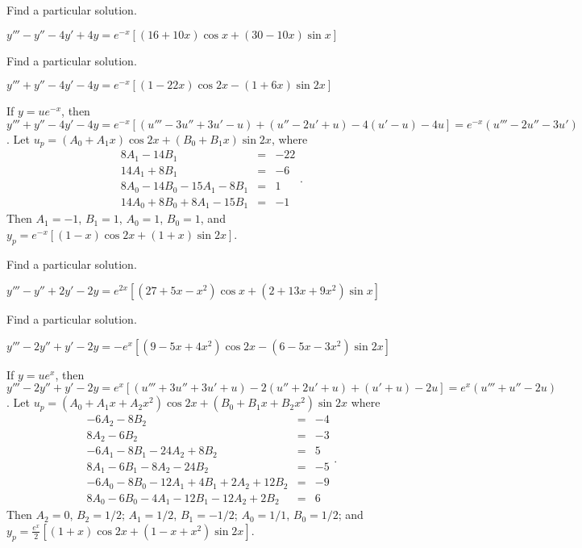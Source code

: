 \documentclass{ximera}
\begin{document}
\begin{problem}\label{exer:9.3.29}   Find a particular solution.

$y'''-y''-4y'+4y=e^{-x}\left[(16+10x)\cos
x+(30-10x)\sin x\right]$
\end{problem}

\begin{problem}\label{exer:9.3.30}   Find a particular solution.

$y'''+y''-4y'-4y=e^{-x}\left[(1-22x)\cos
2x-(1+6x)\sin2x\right]$

\begin{solution}
If $y=ue^{-x}$, then
$y'''+y''-4y'-4y=e^{-x}[
(u'''-3u''+3u'-u) +(u''-2u'+u) -4(u'-u) -4u]
=e^{-x}(u'''-2u''-3u')$.
Let $u_p=(A_0+A_1x)\cos2x+(B_0+B_1x)\sin2x$, where
$$
\begin{array}{rcr}
8A_1-14B_1&=&-22\\
14A_1+8B_1&=&-6\\
8A_0-14B_0-15A_1-8B_1&=&1\\
14A_0+8B_0+8A_1-15B_1&=&-1
\end{array}.
$$
Then
$A_1=-1$, $B_1=1$, $A_0=1$, $B_0=1$, and
$y_p=e^{-x}\left[(1-x)\cos2x+(1+x)\sin2x\right]$.
\end{solution}
\end{problem}

\begin{problem}\label{exer:9.3.31}   Find a particular solution.

$y'''-y''+2y'-2y=e^{2x}[(27+5x-x^2)\cos
x+(2+13x+9x^2)\sin x]$
\end{problem}

\begin{problem}\label{exer:9.3.32}   Find a particular solution.

$y'''-2y''+y'-2y=-e^x[(9-5x+4x^2)\cos
2x-(6-5x-3x^2)\sin2x]$

\begin{solution}
If $y=ue^x$, then
$y'''-2y''+y'-2y=e^x[
(u'''+3u''+3u'+u) -2(u''+2u'+u) +(u'+u) -2u]
=e^x(u'''+u''-2u)$.
Let $u_p=(A_0+A_1x+A_2x^2)\cos2x+(B_0+B_1x+B_2x^2)\sin2x$ where
$$
\begin{array}{rcr}
-6A_2-8B_2&=&-4\\
8A_2-6B_2&=&-3\\
-6A_1-8B_1-24A_2+8B_2&=&5\\
8A_1-6B_1-8A_2-24B_2&=&-5\\
-6A_0-8B_0-12A_1+4B_1+2A_2+12B_2&=&-9\\
8A_0-6B_0-4A_1-12B_1-12A_2+2B_2&=&6
\end{array}.
$$
Then $A_2=0$, $B_2=1/2$; $A_1=1/2$, $B_1=-1/2$; $A_0=1/1$, $B_0=1/2$;
and $y_p=\frac{e^x}{2}[(1+x)\cos2x+(1-x+x^2)\sin2x]$.
\end{solution}
\end{problem}
\end{document}
